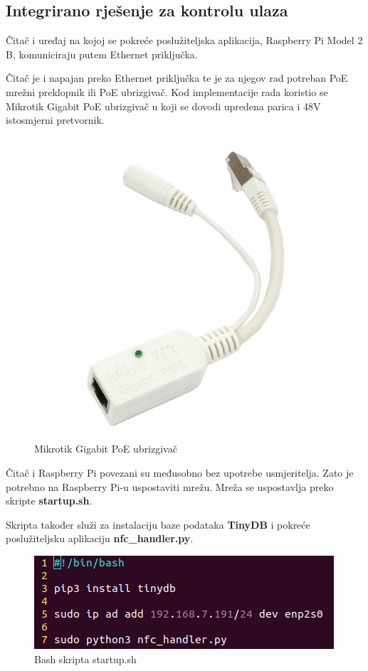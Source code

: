 \documentclass[times, utf8, zavrsni]{fer}
\begin{document}
\newpage

\subsection{Integrirano rješenje za kontrolu ulaza}
Čitač i uređaj na kojoj se pokreće poslužiteljska aplikacija, Raspberry Pi Model 2 B, komuniciraju putem Ethernet priključka. \par 
Čitač je i napajan preko Ethernet priključka te je za njegov rad potreban PoE mrežni preklopnik ili PoE ubrizgivač. Kod implementacije rada koristio se Mikrotik Gigabit PoE ubrizgivač u koji se dovodi upredena parica i 48V istosmjerni pretvornik. 

\begin{figure}[h]
\includegraphics[scale=0.3]{poe.jpg}
\centering
\caption{Mikrotik Gigabit PoE ubrizgivač \citep{14}}
\centering
\end{figure}

Čitač i Raspberry Pi povezani su međusobno bez upotrebe usmjeritelja. Zato je potrebno na Raspberry Pi-u uspostaviti mrežu. Mreža se uspostavlja preko skripte \textbf{startup.sh}.\par 
Skripta također služi za instalaciju baze podataka \textbf{TinyDB} i pokreće poslužiteljsku aplikaciju \textbf{nfc\_handler.py}.

\begin{figure}[h]
\includegraphics[scale=0.6]{skripta.png}
\centering
\caption{Bash skripta startup.sh}
\centering
\end{figure}
\end{document}
